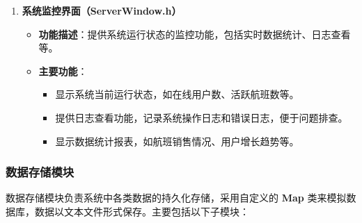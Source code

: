 \documentclass[UTF8, a4paper,12pt]{ctexart}
\begin{document}
\begin{enumerate}
    \item \textbf{系统监控界面（ServerWindow.h）}
    \begin{itemize}
        \item \textbf{功能描述}：提供系统运行状态的监控功能，包括实时数据统计、日志查看等。
        \item \textbf{主要功能}：
        \begin{itemize}
            \item 显示系统当前运行状态，如在线用户数、活跃航班数等。
            \item 提供日志查看功能，记录系统操作日志和错误日志，便于问题排查。
            \item 显示数据统计报表，如航班销售情况、用户增长趋势等。
        \end{itemize}
    \end{itemize}
\end{enumerate}

\subsubsection{数据存储模块}

数据存储模块负责系统中各类数据的持久化存储，采用自定义的 \textbf{Map} 类来模拟数据库，数据以文本文件形式保存。主要包括以下子模块：
\end{document}
